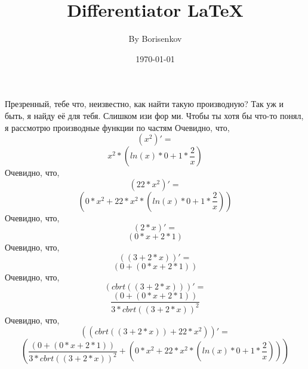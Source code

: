 \documentclass[a4paper,12pt]{article}
\author{By Borisenkov }
\title{Differentiator \LaTeX{}}
\date{\today}
\begin{document}
\maketitle
\newpage
Презренный, тебе что, неизвестно, как найти такую производную?
Так уж и быть, я найду её для тебя. Слишком изи фор ми.
Чтобы ты хотя бы что-то понял, я рассмотрю производные функции по частям
Очевидно, что,
\begin{equation}
\left( {x }^ {2 }\right)' =
\end{equation}
\begin{equation}
{{x }^ {2 }}* {\left( {{ln \left( {x }\right) }* {0 }}+ {{1 }* {\frac{{2 }}{{x }}}}\right) }
\end{equation}
Очевидно, что,
\begin{equation}
\left( {22 }* {{x }^ {2 }}\right)' =
\end{equation}
\begin{equation}
\left( {{0 }* {{x }^ {2 }}}+ {{22 }* {{{x }^ {2 }}* {\left( {{ln \left( {x }\right) }* {0 }}+ {{1 }* {\frac{{2 }}{{x }}}}\right) }}}\right) 
\end{equation}
Очевидно, что,
\begin{equation}
\left( {2 }* {x }\right)' =
\end{equation}
\begin{equation}
\left( {{0 }* {x }}+ {{2 }* {1 }}\right) 
\end{equation}
Очевидно, что,
\begin{equation}
\left( \left( {3 }+ {{2 }* {x }}\right) \right)' =
\end{equation}
\begin{equation}
\left( {0 }+ {\left( {{0 }* {x }}+ {{2 }* {1 }}\right) }\right) 
\end{equation}
Очевидно, что,
\begin{equation}
\left( cbrt \left( {\left( {3 }+ {{2 }* {x }}\right) }\right) \right)' =
\end{equation}
\begin{equation}
\frac{{\left( {0 }+ {\left( {{0 }* {x }}+ {{2 }* {1 }}\right) }\right) }}{{{3 }* {{cbrt \left( {\left( {3 }+ {{2 }* {x }}\right) }\right) }^ {2 }}}}
\end{equation}
Очевидно, что,
\begin{equation}
\left( \left( {cbrt \left( {\left( {3 }+ {{2 }* {x }}\right) }\right) }+ {{22 }* {{x }^ {2 }}}\right) \right)' =
\end{equation}
\begin{equation}
\left( {\frac{{\left( {0 }+ {\left( {{0 }* {x }}+ {{2 }* {1 }}\right) }\right) }}{{{3 }* {{cbrt \left( {\left( {3 }+ {{2 }* {x }}\right) }\right) }^ {2 }}}}}+ {\left( {{0 }* {{x }^ {2 }}}+ {{22 }* {{{x }^ {2 }}* {\left( {{ln \left( {x }\right) }* {0 }}+ {{1 }* {\frac{{2 }}{{x }}}}\right) }}}\right) }\right) 
\end{equation}
\end{document}
